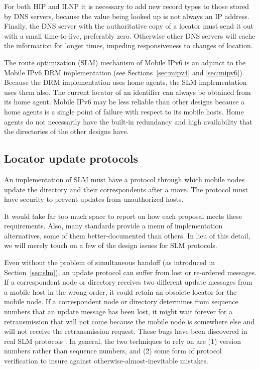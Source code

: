 For both HIP and ILNP
it is necessary to add new record types to those stored
by DNS servers, because the value being looked up is not always an
IP address.
Finally, the DNS server with 
the authoritative copy of a locator must send it out with
a small time-to-live, preferably zero.
Otherwise other DNS servers 
will cache the information for longer times, 
impeding responsiveness to changes of location.

The route optimization (SLM) 
mechanism of Mobile IPv6 is an adjunct to the Mobile IPv6
DRM implementation (see Sections~\ref{sec:mipv4} and \ref{sec:mipv6}).
Because the DRM implementation uses home agents, the SLM implementation
uses them also.
The current locator of an identifier can always be obtained from its
home agent.
Mobile IPv6 may be less reliable than other designs because 
a home agents is a single point of failure with respect to its
mobile hosts.
Home agents do not necessarily have the built-in redundancy and
high availability that the directories of the other designs have.

\subsection{Locator update protocols}
\label{sec:updateprotocols}

An implementation of SLM must have a protocol through which 
mobile nodes update the directory and their correspondents after
a move.
The protocol must have security to prevent updates from unauthorized
hosts.

It would take far too much space to report on how each proposal
meets these requirements.
Also, many standards provide a menu of implementation alternatives,
some of them better-documented than others.
In lieu of this detail, 
we will merely touch on a few of the design issues for SLM
protocols.

Even without the problem of simultaneous handoff (as introduced in
Section~\ref{sec:slm}), an update protocol can suffer from lost
or re-ordered messages.
If a correspondent node or directory
receives two different update messages from a
mobile host in the wrong order, it could retain an obsolete locator
for the mobile node.
If a correspondent node or directory
determines from sequence numbers that an
update message has been lost, it might wait forever for a retransmission
that will not come because the mobile node is somewhere else and will
not receive the retransmission request.
These bugs have been discovered in real SLM protocols \cite{serval-icnp}.
In general, the two techniques to rely on are (1) version numbers
rather than sequence numbers, and (2) some form of protocol verification
to insure against otherwise-almost-inevitable mistakes.

